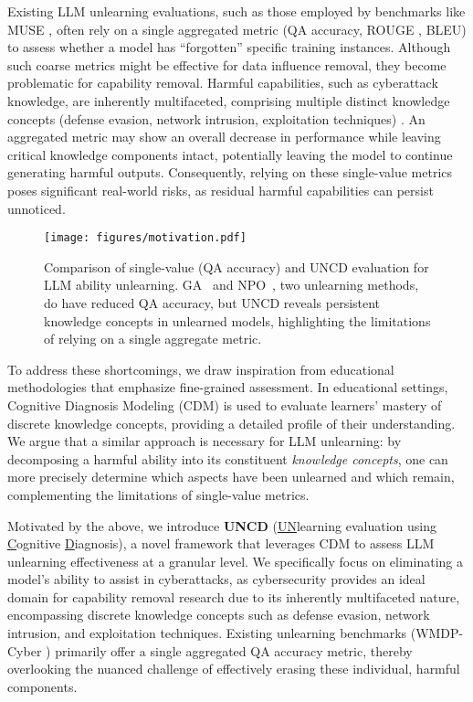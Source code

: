 Existing LLM unlearning evaluations, such as those employed by benchmarks like MUSE \citep{shi2024muse}, often rely on a single aggregated metric (\eg QA accuracy, ROUGE \citep{lin2004rouge}, BLEU\citep{papineni2002bleu}) to assess whether a model has “forgotten” specific training instances. Although such coarse metrics might be effective for data influence removal, they become problematic for capability removal. Harmful capabilities, such as cyberattack knowledge, are inherently multifaceted, comprising multiple distinct knowledge concepts (\eg defense evasion, network intrusion, exploitation techniques) \citep{strom2018mitre}. An aggregated metric may show an overall decrease in performance while leaving critical knowledge components intact, potentially leaving the model to continue generating harmful outputs. Consequently, relying on these single-value metrics poses significant real-world risks, as residual harmful capabilities can persist unnoticed.

\begin{wrapfigure}{r}{0.5\textwidth}
    \vspace{-10pt}
    \texttt{[image: figures/motivation.pdf]}
    \caption{Comparison of single-value  (QA accuracy) and UNCD evaluation for LLM ability unlearning. GA~\citep{thudi2022unrolling} and NPO~\citep{zhang2024negative}, two unlearning methods, do have reduced QA accuracy, but UNCD reveals persistent knowledge concepts in unlearned models, highlighting the limitations of relying on a single aggregate metric.}
    \label{fig:motivation}
    \vspace{-10pt}
\end{wrapfigure}

To address these shortcomings, we draw inspiration from educational methodologies that emphasize fine-grained assessment. In educational settings, Cognitive Diagnosis Modeling (CDM) \citep{wang2022neuralcd,liu2024inductive} is used to evaluate learners’ mastery of discrete knowledge concepts, providing a detailed profile of their understanding. We argue that a similar approach is necessary for LLM unlearning: by decomposing a harmful ability into its constituent \emph{knowledge concepts}, one can more precisely determine which aspects have been unlearned and which remain,  complementing the limitations of single-value metrics.

Motivated by the above, we introduce \textbf{UNCD} (\underline{UN}learning evaluation using \underline{C}ognitive \underline{D}iagnosis), a novel framework that leverages CDM  to assess LLM unlearning effectiveness at a granular level. We specifically focus on eliminating a model’s ability to assist in cyberattacks, as cybersecurity provides an ideal domain for capability removal research due to its inherently multifaceted nature, encompassing discrete knowledge concepts such as defense evasion, network intrusion, and exploitation techniques. Existing unlearning benchmarks (\eg WMDP-Cyber \citep{li2024wmdp}) primarily offer a single aggregated QA accuracy metric, thereby overlooking the nuanced challenge of effectively erasing these individual, harmful components.

